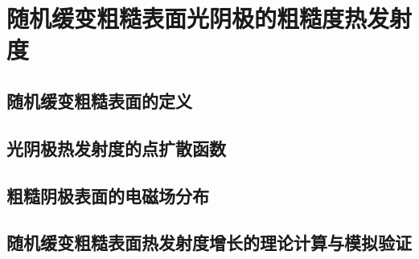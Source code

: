 \chapter{随机缓变粗糙表面光阴极的粗糙度热发射度}
\label{chap:roughness}

\section{随机缓变粗糙表面的定义}

\section{光阴极热发射度的点扩散函数}

\section{粗糙阴极表面的电磁场分布}

\section{随机缓变粗糙表面热发射度增长的理论计算与模拟验证}

